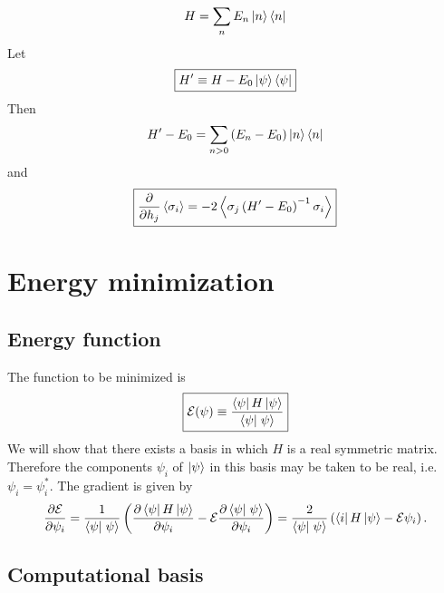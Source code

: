\begin{equation}
  H = \sum_n E_n \left| n \right> \left< n \right|
  \label{}
\end{equation}
Let
\begin{equation}
  \boxed{
  H^{\prime} \equiv H - E_0 \left| \psi \right> \left< \psi \right|
  }
  \label{}
\end{equation}
Then
\begin{equation}
  H^{\prime} - E_0 = \sum_{n>0} \left( E_n - E_0 \right) \left| n \right> \left< n \right|
  \label{}
\end{equation}
and
\begin{equation}
  \boxed{
  \frac{\partial }{\partial h_j} \left< \sigma_i \right>
  = -2 \left< \sigma_j \left( H^{\prime} - E_0 \right)^{-1} \sigma_i \right>
  }
  \label{}
\end{equation}


\section{Energy minimization}

\subsection{Energy function}

The function to be minimized is
\begin{equation}
  \boxed{
  \mathcal{E}(\psi) 
  \equiv \frac{\matrixel{\psi}{H}{\psi}}{\braket{\psi}{\psi}}
  }
  \label{eq:energy}
\end{equation}
We will show that there exists a basis in which $H$ is a real symmetric matrix.
Therefore the components $\psi_i$ of $\left| \psi \right>$ in this basis may be taken to
be real, i.e. $\psi_i = \psi_i^*$.  The gradient is given by
\begin{equation}
  \pd{\mathcal{E}}{\psi_i}
  = \frac{1}{\braket{\psi}{\psi}}
  \left( \pd{\matrixel{\psi}{H}{\psi}}{\psi_i} - \mathcal{E} \pd{\braket{\psi}{\psi}}{\psi_i} \right)
  = \frac{2}{\braket{\psi}{\psi}}
  \left( \matrixel{i}{H}{\psi} - \mathcal{E} \psi_i \right).
  \label{eq:grad}
\end{equation}

\subsection{Computational basis}

